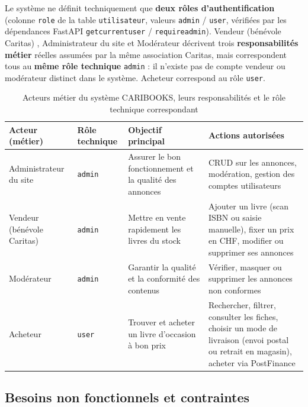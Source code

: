 \documentclass[12pt, a4paper]{report}
\renewcommand{\_}{\origunderscore\allowbreak}
\begin{document}
\noindent Le système ne définit techniquement que \textbf{deux rôles d'authentification} (colonne \texttt{role} de la table \texttt{utilisateur}, valeurs \texttt{admin} / \texttt{user}, vérifiées par les dépendances FastAPI \texttt{get\_current\_user} / \texttt{require\_admin}). \og Vendeur (bénévole Caritas) \fg{}, \og Administrateur du site \fg{} et \og Modérateur \fg{} décrivent trois \textbf{responsabilités métier} réelles assumées par la même association Caritas, mais correspondent tous au \textbf{même rôle technique} \texttt{admin} : il n'existe pas de compte \og vendeur \fg{} ou \og modérateur \fg{} distinct dans le système. \og Acheteur \fg{} correspond au rôle \texttt{user}.

\begin{table}[h]
\centering
\renewcommand{\arraystretch}{1.4}
\begin{tabular}{@{}p{3.2cm}p{2cm}p{3.3cm}p{5.9cm}@{}}
\toprule
\textbf{Acteur (métier)} & \textbf{Rôle technique} & \textbf{Objectif principal} & \textbf{Actions autorisées} \\
\midrule
Administrateur du site & \texttt{admin} & Assurer le bon fonctionnement et la qualité des annonces & CRUD sur les annonces, modération, gestion des comptes utilisateurs \\
Vendeur (bénévole Caritas) & \texttt{admin} & Mettre en vente rapidement les livres du stock & Ajouter un livre (scan ISBN ou saisie manuelle), fixer un prix en CHF, modifier ou supprimer ses annonces \\
Modérateur & \texttt{admin} & Garantir la qualité et la conformité des contenus & Vérifier, masquer ou supprimer les annonces non conformes \\
Acheteur & \texttt{user} & Trouver et acheter un livre d'occasion à bon prix & Rechercher, filtrer, consulter les fiches, choisir un mode de livraison (envoi postal ou retrait en magasin), acheter via PostFinance \\
\bottomrule
\end{tabular}
\caption{Acteurs métier du système CARIBOOKS, leurs responsabilités et le rôle technique correspondant}
\label{tab:acteurs}
\end{table}

\subsection{Besoins non fonctionnels et contraintes}
\end{document}
